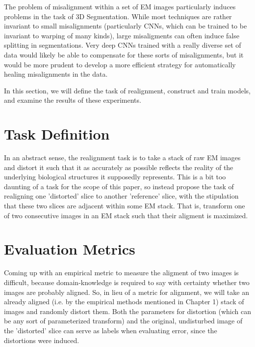 The problem of misalignment within a set of EM images particularly induces problems in the task of 3D Segmentation. While most techniques are rather invariant to small misalignments (particularly CNNs, which can be trained to be invariant to warping of many kinds), large misaligments can often induce false splitting in segmentations. Very deep CNNs trained with a really diverse set of data would likely be able to compensate for these sorts of misalignments, but it would be more prudent to develop a more efficient strategy for automatically healing misalignments in the data. 

In this section, we will define the task of realignment, construct and train models, and examine the results of these experiments. 


\section{Task Definition}

In an abstract sense, the realignment task is to take a stack of raw EM images and distort it such that it as accurately as possible reflects the reality of the underlying biological structures it supposedly represents. This is a bit too daunting of a task for the scope of this paper, so instead propose the task of realigning one 'distorted' slice to another 'reference' slice, with the stipulation that these two slices are adjacent within some EM stack. That is, transform one of two consecutive images in an EM stack such that their aligment is maximized.

\section{Evaluation Metrics}

Coming up with an empirical metric to measure the aligment of two images is difficult, because domain-knowledge is required to say with certainty whether two images are probably aligned. So, in lieu of a metric for alignment, we will take an already aligned (i.e. by the empirical methods mentioned in Chapter 1) stack of images and randomly distort them. Both the parameters for distortion (which can be any sort of parameterized transform) and the original, undisturbed image of the 'distorted' slice can serve as labels when evaluating error, since the distortions were induced.

